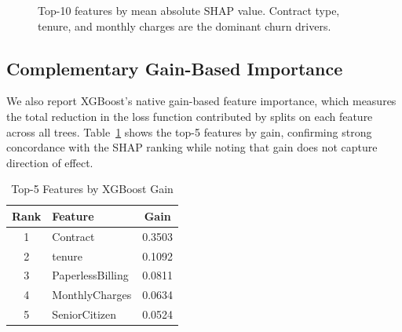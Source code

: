 \documentclass[10pt, conference, letterpaper]{IEEEtran}
\begin{document}
\begin{figure}[htbp]
\centering
{}
\caption{Top-10 features by mean absolute SHAP value. Contract type, tenure, and monthly charges are the dominant churn drivers.}
\label{fig:shap}
\end{figure}

\subsection{Complementary Gain-Based Importance}

We also report XGBoost's native gain-based feature importance, which measures the total reduction in the loss function contributed by splits on each feature across all trees. Table~\ref{tab:gain_top5} shows the top-5 features by gain, confirming strong concordance with the SHAP ranking while noting that gain does not capture direction of effect.

\begin{table}[htbp]
\caption{Top-5 Features by XGBoost Gain}
\label{tab:gain_top5}
\begin{center}
\begin{tabular}{@{}clc@{}}
\toprule
\textbf{Rank} & \textbf{Feature} & \textbf{Gain} \\
\midrule
1 & Contract        & 0.3503 \\
2 & tenure          & 0.1092 \\
3 & PaperlessBilling & 0.0811 \\
4 & MonthlyCharges  & 0.0634 \\
5 & SeniorCitizen   & 0.0524 \\
\bottomrule
\end{tabular}
\end{center}
\end{table}
\end{document}
